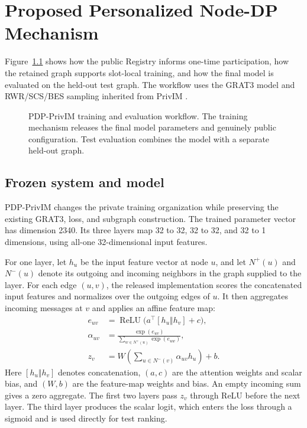 \chapter{Proposed Personalized Node-DP Mechanism}\label{ch:method}
Figure~\ref{fig:pdp-workflow} shows how the public Registry informs one-time participation, how the retained graph supports slot-local training, and how the final model is evaluated on the held-out test graph. The workflow uses the GRAT3 model and RWR/SCS/BES sampling inherited from PrivIM \cite{hou2025}.

\begin{figure}[htbp]
\centering

\caption[PDP-PrivIM training and evaluation workflow]{PDP-PrivIM training and evaluation workflow. The training mechanism releases the final model parameters and genuinely public configuration. Test evaluation combines the model with a separate held-out graph.}
\label{fig:pdp-workflow}
\end{figure}

\section{Frozen system and model}
PDP-PrivIM changes the private training organization while preserving the existing GRAT3, loss, and subgraph construction. The trained parameter vector has dimension 2340. Its three layers map 32 to 32, 32 to 32, and 32 to 1 dimensions, using all-one 32-dimensional input features.

For one layer, let $h_u$ be the input feature vector at node $u$, and let $N^+(u)$ and $N^-(u)$ denote its outgoing and incoming neighbors in the graph supplied to the layer. For each edge $(u,v)$, the released implementation scores the concatenated input features and normalizes over the outgoing edges of $u$. It then aggregates incoming messages at $v$ and applies an affine feature map:
\begin{align}
 e_{uv} &= \operatorname{ReLU}\bigl(a^\top[h_u\Vert h_v]+c\bigr), \\
 \alpha_{uv} &= \frac{\exp(e_{uv})}{\sum_{w\in N^+(u)}\exp(e_{uw})}, \\
 z_v &= W\left(\sum_{u\in N^-(v)}\alpha_{uv}h_u\right)+b .
\end{align}
Here $[h_u\Vert h_v]$ denotes concatenation, $(a,c)$ are the attention weights and scalar bias, and $(W,b)$ are the feature-map weights and bias. An empty incoming sum gives a zero aggregate. The first two layers pass $z_v$ through ReLU before the next layer. The third layer produces the scalar logit, which enters the loss through a sigmoid and is used directly for test ranking.

